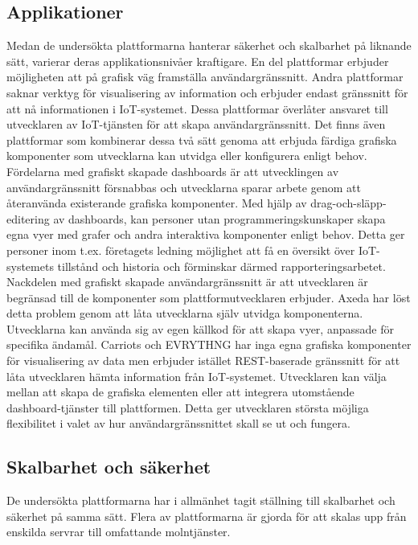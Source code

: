 \subsection{Applikationer}
Medan de undersökta plattformarna hanterar säkerhet och skalbarhet på liknande
sätt, varierar deras applikationsnivåer kraftigare. En del plattformar
erbjuder möjligheten att på grafisk väg framställa användargränssnitt.
Andra plattformar saknar verktyg för visualisering av information och erbjuder
endast gränssnitt för att nå informationen i IoT-systemet. Dessa plattformar
överlåter ansvaret till utvecklaren av IoT-tjänsten för att skapa
användargränssnitt. Det finns även plattformar som kombinerar dessa två sätt
genoma att erbjuda färdiga grafiska komponenter som utvecklarna kan utvidga
eller konfigurera enligt behov.
\newline
\newline
Fördelarna med grafiskt skapade dashboards är att utvecklingen av
användargränssnitt försnabbas och utvecklarna sparar arbete genom att 
återanvända existerande grafiska komponenter. Med hjälp av drag-och-släpp-
editering av dashboards, kan personer utan programmeringskunskaper skapa egna 
vyer med grafer och andra interaktiva komponenter enligt behov. Detta
ger personer inom t.ex. företagets ledning möjlighet att få en översikt över
IoT-systemets tillstånd och historia och förminskar därmed rapporteringsarbetet.
Nackdelen med grafiskt skapade användargränssnitt är att utvecklaren är 
begränsad till de komponenter som plattformutvecklaren erbjuder. Axeda har löst
detta problem genom att låta utvecklarna själv utvidga komponenterna.
Utvecklarna kan använda sig av egen källkod för att skapa vyer, anpassade för
specifika ändamål.
\newline
\newline
Carriots och EVRYTHNG har inga egna grafiska komponenter för visualisering
av data men erbjuder istället REST-baserade gränssnitt för att låta utvecklaren
hämta information från IoT-systemet. Utvecklaren kan välja mellan att skapa
de grafiska elementen eller att integrera utomstående dashboard-tjänster till
plattformen. Detta ger utvecklaren största möjliga flexibilitet i valet av hur 
användargränssnittet skall se ut och fungera.
\newline
\newline

\subsection{Skalbarhet och säkerhet}
De undersökta plattformarna har i allmänhet tagit ställning till skalbarhet
och säkerhet på samma sätt. Flera av plattformarna är gjorda för att skalas upp
från enskilda servrar till omfattande molntjänster. 


